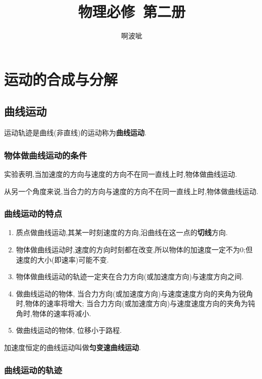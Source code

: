 \documentclass[11pt,a4paper]{ctexart}
\title{物理必修\ 第二册}
\author{啊波呲}
\begin{document}
\maketitle
{}
\tableofcontents

\newpage
{}

\section{运动的合成与分解}

\subsection{曲线运动}

运动轨迹是曲线(非直线)的运动称为\textbf{曲线运动}.

\subsubsection*{物体做曲线运动的条件}

实验表明,当加速度的方向与速度的方向不在同一直线上时,物体做曲线运动.

从另一个角度来说,当合力的方向与速度的方向不在同一直线上时,物体做曲线运动.

\subsubsection*{曲线运动的特点}
\begin{enumerate}
	\item 质点做曲线运动,其某一时刻速度的方向,沿曲线在这一点的\textbf{切线}方向.
	\item 物体做曲线运动时,速度的方向时刻都在改变,所以物体的加速度一定不为0;但速度的大小(即速率)可能不变.
	\item 物体做曲线运动的轨迹一定夹在合力方向(或加速度方向)与速度方向之间.
	\item 做曲线运动的物体, 当合力方向(或加速度方向)与速度速度方向的夹角为锐角时,物体的速率将增大;
	      当合力方向(或加速度方向)与速度速度方向的夹角为钝角时,物体的速率将减小.
	\item 做曲线运动的物体, 位移小于路程.
\end{enumerate}

加速度恒定的曲线运动叫做\textbf{匀变速曲线运动}.

\subsubsection*{曲线运动的轨迹}
\end{document}
